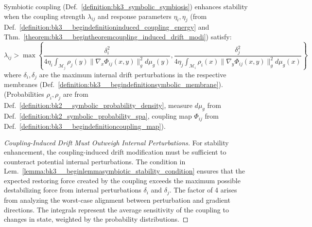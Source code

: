 \begin{lemma} \label{lemma:bk3__beginlemmasymbiotic_stability_condition}
Symbiotic coupling (Def.~\ref{definition:bk3_symbolic_symbiosis}) enhances stability when the coupling strength $\lambda_{ij}$ and response parameters $\eta_i, \eta_j$ (from Def.~\ref{definition:bk3__begindefinitioninduced_coupling_energy} and Thm.~\ref{theorem:bk3__begintheoremcoupling_induced_drift_modi}) satisfy:
\[
\lambda_{ij} > \max\left\{\frac{\delta_i^2}{4\eta_i \int_{\mathcal{M}_j} \rho_j(y)\|\nabla_x \Phi_{ij}(x,y)\|_g^2 d\mu_g(y)}, \frac{\delta_j^2}{4\eta_j \int_{\mathcal{M}_i} \rho_i(x)\|\nabla_y \Phi_{ij}(x,y)\|_g^2 d\mu_g(x)}\right\}
\]
where $\delta_i, \delta_j$ are the maximum internal drift perturbations in the respective membranes (Def.~\ref{definition:bk3__begindefinitionsymbolic_membrane}). (Probabilities $\rho_i, \rho_j$ are from Def.~\ref{definition:bk2__symbolic_probability_density}, measure $d\mu_g$ from Def.~\ref{definition:bk2_symbolic_probability_spa}, coupling map $\Phi_{ij}$ from Def.~\ref{definition:bk3__begindefinitioncoupling_map}).
\end{lemma}

\begin{proof}[Coupling-Induced Drift Must Outweigh Internal Perturbations]
\label{proof:bk3_coupling_vs_perturbation_stability}
For stability enhancement, the coupling-induced drift modification must be sufficient to counteract potential internal perturbations. The condition in Lem.~\ref{lemma:bk3__beginlemmasymbiotic_stability_condition} ensures that the expected restoring force created by the coupling exceeds the maximum possible destabilizing force from internal perturbations $\delta_i$ and $\delta_j$. The factor of 4 arises from analyzing the worst-case alignment between perturbation and gradient directions. The integrals represent the average sensitivity of the coupling to changes in state, weighted by the probability distributions.
\end{proof}

